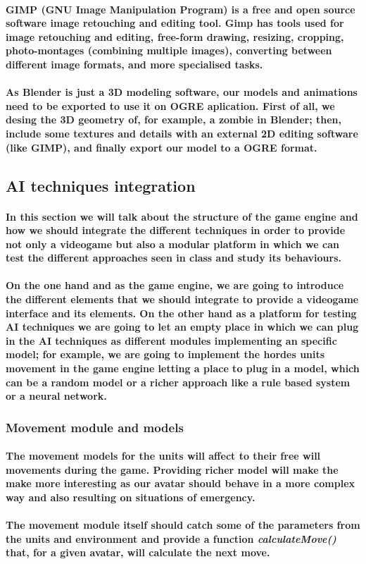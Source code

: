 \documentclass[a4paper,10pt]{article}
\newcommand{\p}[1]{\paragraph{\indent\textnormal{#1}}}
\begin{document}
    \p{\textbf{GIMP} (GNU Image Manipulation Program) is a free and open source software image retouching and editing tool. Gimp has tools used for image retouching and editing, free-form drawing, resizing, cropping, photo-montages (combining multiple images), converting between different image formats, and more specialised tasks. }

    \p{As Blender is just a 3D modeling software, our models and animations need to be exported to use it on OGRE aplication. First of all, we desing the 3D geometry of, for example, a zombie in Blender; then, include some textures and details with an external 2D editing software (like GIMP), and finally export our model to a OGRE format.}

  \subsection{AI techniques integration}

  \p{In this section we will talk about the structure of the game engine and how we should integrate the different techniques in order to provide not only a videogame but also a modular platform in which we can test the different approaches seen in class and study its behaviours.}

  \p{On the one hand and as the game engine, we are going to introduce the different elements that we should integrate to provide a videogame interface and its elements. On the other hand as a platform for testing AI techniques we are going to let an empty place in which we can plug in the AI techniques as different modules implementing an specific model; for example, we are going to implement the hordes units movement in the game engine letting a place to plug in a model, which can be a random model or a richer approach like a rule based system or a neural network.}
  
  \subsubsection{Movement module and models}
    
    \p{The movement models for the units will affect to their free will movements during the game. Providing richer model will make the make more interesting as our avatar should behave in a more complex way and also resulting on situations of emergency.}

    \p{The movement module itself should catch some of the parameters from the units and environment and provide a function \textit{calculateMove()} that, for a given avatar, will calculate the next move.}
\end{document}
